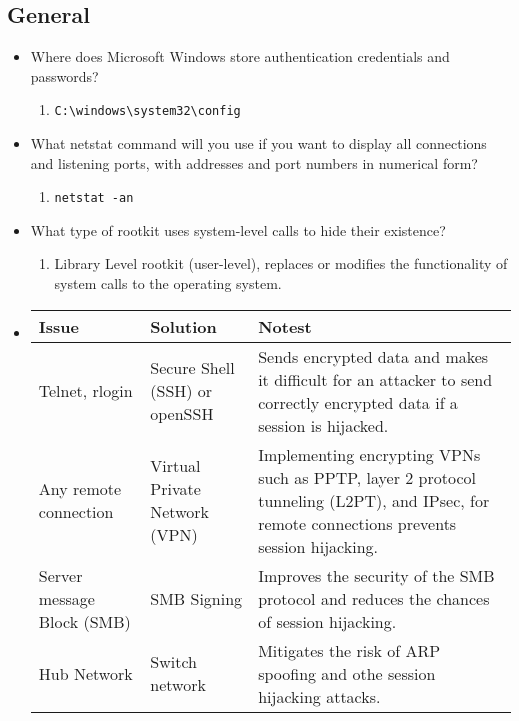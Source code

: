 \subsection{General}
\begin{itemize}
    \item Where does Microsoft Windows store authentication credentials and passwords?
    \begin{enumerate}
        \item \verb|C:\windows\system32\config|
    \end{enumerate}
    \item What netstat command will you use if you want to display all connections and listening ports, with addresses and port numbers in numerical form?
    \begin{enumerate}
        \item \verb|netstat -an|
    \end{enumerate}
    \item What type of rootkit uses system-level calls to hide their existence?
    \begin{enumerate}
        \item Library Level rootkit (user-level), replaces or modifies the functionality of system calls to the operating system.
    \end{enumerate}
    \item \begin{tabular}[H]{|l|l|l|}
        \hline
        \textbf{Issue} & \textbf{Solution} & \textbf{Notest}\\
        \hline
        Telnet, rlogin & Secure Shell (SSH) or openSSH & Sends encrypted data and makes it difficult for an attacker to send correctly encrypted data if a session is hijacked.\\
        \hline
        Any remote connection & Virtual Private Network (VPN) & Implementing encrypting VPNs such as PPTP, layer 2 protocol tunneling (L2PT), and IPsec, for remote connections prevents session hijacking.\\
        \hline
        Server message Block (SMB) & SMB Signing & Improves the security of the SMB protocol and reduces the chances of session hijacking.\\
        \hline
        Hub Network & Switch network & Mitigates the risk of ARP spoofing and othe session hijacking attacks. 
    \end{tabular}
\end{itemize}